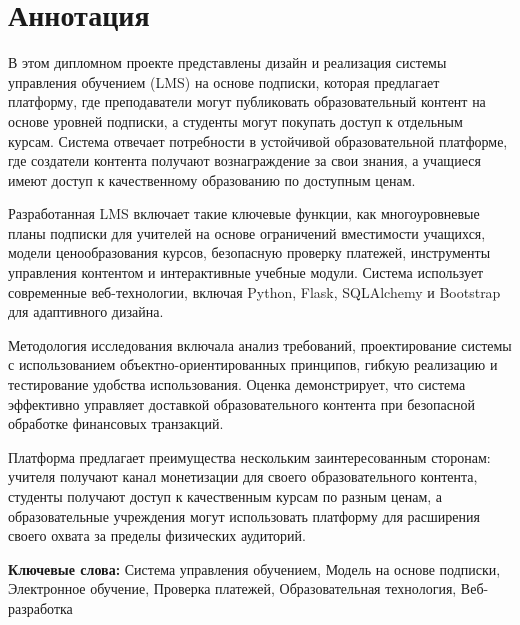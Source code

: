 \newpage
\section*{Аннотация}
\thispagestyle{empty}

В этом дипломном проекте представлены дизайн и реализация системы управления обучением (LMS) на основе подписки, которая предлагает платформу, где преподаватели могут публиковать образовательный контент на основе уровней подписки, а студенты могут покупать доступ к отдельным курсам. Система отвечает потребности в устойчивой образовательной платформе, где создатели контента получают вознаграждение за свои знания, а учащиеся имеют доступ к качественному образованию по доступным ценам.

Разработанная LMS включает такие ключевые функции, как многоуровневые планы подписки для учителей на основе ограничений вместимости учащихся, модели ценообразования курсов, безопасную проверку платежей, инструменты управления контентом и интерактивные учебные модули. Система использует современные веб-технологии, включая Python, Flask, SQLAlchemy и Bootstrap для адаптивного дизайна.

Методология исследования включала анализ требований, проектирование системы с использованием объектно-ориентированных принципов, гибкую реализацию и тестирование удобства использования. Оценка демонстрирует, что система эффективно управляет доставкой образовательного контента при безопасной обработке финансовых транзакций.

Платформа предлагает преимущества нескольким заинтересованным сторонам: учителя получают канал монетизации для своего образовательного контента, студенты получают доступ к качественным курсам по разным ценам, а образовательные учреждения могут использовать платформу для расширения своего охвата за пределы физических аудиторий.

\textbf{Ключевые слова:} Система управления обучением, Модель на основе подписки, Электронное обучение, Проверка платежей, Образовательная технология, Веб-разработка